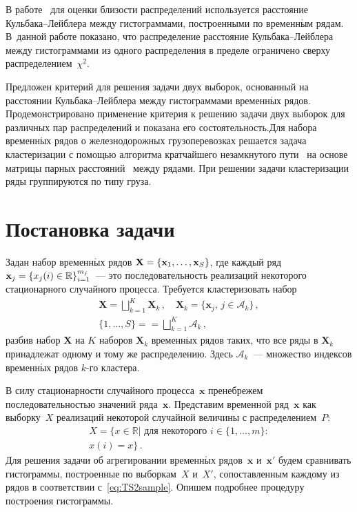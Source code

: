 \begin{multicols}{2}
В работе~\cite{Medvednikova2012} для оценки близости распределений используется
расстояние Кульбака--Лейблера между гистограммами, построенными по временн$\acute{\mbox{ы}}$м рядам.
В~данной работе показано, что распределение расстояние Куль\-ба\-ка--Лейб\-ле\-ра между
гис\-то\-грам\-ма\-ми из одного распределения в пределе ограничено сверху распределением~$\chi^2$.

Предложен критерий для решения задачи двух выборок, основанный на расстоянии
Куль\-ба\-ка--Лейб\-ле\-ра между гистограммами временн$\acute{\mbox{ы}}$х рядов. Продемонстрировано
применение критерия к решению задачи двух выборок для различных пар распределений
и показана его состоятельность.\linebreak Для набора временн$\acute{\mbox{ы}}$х рядов о железнодорожных
грузоперевозках решается задача кластеризации с помощью алгоритма кратчайшего
незамкнутого пути~\cite{Dvoenko1999} на основе матрицы парных\linebreak
расстояний~\cite{StrijovRudakov, Dvoenko2013} между рядами. При решении задачи
кластеризации ряды группируются по типу груза.

\section{Постановка задачи}

Задан набор временн$\acute{\mbox{ы}}$х рядов
$\mathbf{X}\hm = \{\mathbf{x}_1, \dots, \mathbf{x}_S\}$, где каждый ряд
$\mathbf{x}_j \hm= \{x_j(i)\in\mathbb{R}\}_{i = 1}^{m_j}$~--- это
последовательность реализаций некоторого стационарного случайного процесса.
Требуется кластеризовать набор
\begin{multline}
\label{eq:clastering}
\mathbf{X} = \bigsqcup\limits_{k = 1}^{K} \mathbf{X}_k\,,\quad
\mathbf{X}_k = \{\mathbf{x}_j,\,j\in \mathcal{A}_k\}\,,\\
\{1,\dots , S\} =
= \bigsqcup\limits_{k=1}^{K} \mathcal{A}_k\,,
\end{multline}
разбив набор $\mathbf{X}$ на $K$ наборов $\mathbf{X}_k$ временн$\acute{\mbox{ы}}$х
рядов таких, что все ряды в $\mathbf{X}_k$ принадлежат одному и тому же
распределению. Здесь $\mathcal{A}_k$~--- множество индексов временн$\acute{\mbox{ы}}$х рядов
$k$-го кластера.

В силу стационарности случайного процесса~$\mathbf{x}$
пренебрежем последовательностью значений ряда~$\mathbf{x}$. Представим временной
ряд~$\mathbf{x}$ как выборку~$X$ реализаций некоторой случайной величины с
распределением~$P$:
\begin{multline}
\label{eq:TS2sample}
X = \{x\in\mathbb{R} | \mbox{~для некоторого\ } i\in\{1, \dots, m\}:\\
 x(i) = x\}\,.
\end{multline}
 Для решения задачи об агрегировании временн$\acute{\mbox{ы}}$х рядов~$\mathbf{x}$ и~$\mathbf{x}'$
 будем сравнивать гистограммы, построенные по выборкам~$X$ и~$X'$,
 сопоставленным каждому из рядов в соответствии с~\eqref{eq:TS2sample}.
 Опишем подробнее процедуру построения гистограммы.


\end{multicols}
